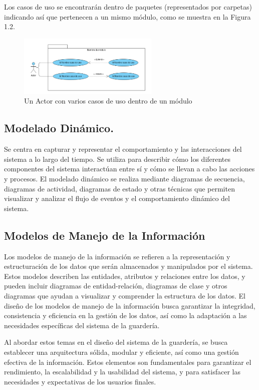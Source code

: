 Los casos de uso se encontrarán dentro de paquetes (representados por carpetas) indicando así que pertenecen a un mismo módulo, como se muestra en la Figura 1.2.

\begin{figure}[htbp]
    \centering
    \includegraphics[width=0.6\textwidth]{images/interaccion2.png}
    \caption{Un Actor con varios casos de uso dentro de un módulo}
    \label{fig:actor-varios-casos-uso-modulo}
\end{figure}


\subsection{ Modelado Dinámico.}

Se centra en capturar y representar el comportamiento y las interacciones del sistema a lo largo del tiempo. Se utiliza para describir cómo los diferentes componentes del sistema interactúan entre sí y cómo se llevan a cabo las acciones y procesos. El modelado dinámico se realiza mediante diagramas de secuencia, diagramas de actividad, diagramas de estado y otras técnicas que permiten visualizar y analizar el flujo de eventos y el comportamiento dinámico del sistema.




\subsection{Modelos de Manejo de la Información}
Los modelos de manejo de la información se refieren a la representación y estructuración de los datos que serán almacenados y manipulados por el sistema. Estos modelos describen las entidades, atributos y relaciones entre los datos, y pueden incluir diagramas de entidad-relación, diagramas de clase y otros diagramas que ayudan a visualizar y comprender la estructura de los datos. El diseño de los modelos de manejo de la información busca garantizar la integridad, consistencia y eficiencia en la gestión de los datos, así como la adaptación a las necesidades específicas del sistema de la guardería.

Al abordar estos temas en el diseño del sistema de la guardería, se busca establecer una arquitectura sólida, modular y eficiente, así como una gestión efectiva de la información. Estos elementos son fundamentales para garantizar el rendimiento, la escalabilidad y la usabilidad del sistema, y para satisfacer las necesidades y expectativas de los usuarios finales.